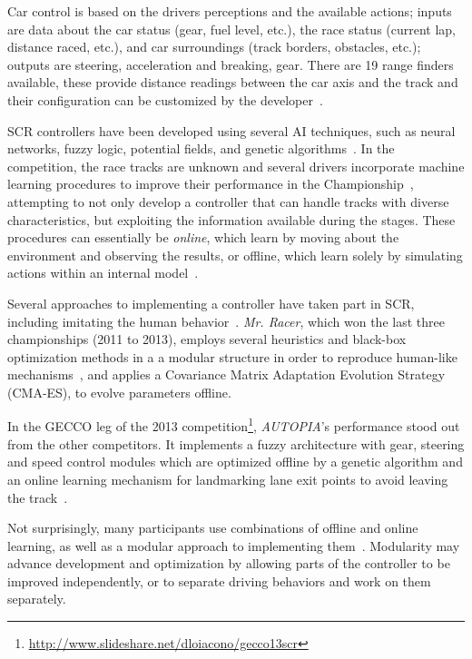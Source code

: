 Car control is based on the drivers perceptions and the available actions; inputs are data about the car status (gear, fuel level, etc.), the race status (current lap, distance raced, etc.), and car surroundings (track borders, obstacles, etc.); outputs are steering, acceleration and breaking, gear. There are 19 range finders available, these provide distance readings between the car axis and the track and their configuration can be customized by the developer~\cite{SCR}.

SCR controllers have been developed using several AI techniques, such as neural networks, fuzzy logic, potential fields, and genetic algorithms~\cite{Loiacono:2012:LEA:2212908.2212953}. In the competition, the race tracks are unknown and several drivers incorporate machine learning procedures to improve their performance in the Championship~\cite{2009}, attempting to not only develop a controller that can handle tracks with diverse characteristics, but exploiting the information available during the stages. These procedures can essentially be \emph{online}, which learn by moving about the environment and observing the results, or offline, which learn solely by simulating actions within an internal model~\cite{mitchell_1997}.

Several approaches to implementing a controller have taken part in SCR, including imitating the human behavior~\cite{Exp,5593318}. \emph{Mr. Racer}, which won the last three championships (2011 to 2013), employs several heuristics and black-box optimization methods in a a modular structure in order to reproduce human-like mechanisms~\cite{MrRacer}, and applies a Covariance Matrix Adaptation Evolution Strategy (CMA-ES), to evolve parameters offline.

In the GECCO leg of the 2013 competition\footnote{\url{http://www.slideshare.net/dloiacono/gecco13scr}}, \emph{AUTOPIA}'s performance stood out from the other competitors. It implements a fuzzy architecture with gear, steering and speed control modules which are optimized offline by a genetic algorithm and an online learning mechanism for landmarking lane exit points to avoid leaving the track~\cite{AUTOPIA}.

Not surprisingly, many participants use combinations of offline and online learning, as well as a modular approach to implementing them~\cite{2009,DIEGO,Exp}. Modularity may advance development and optimization by allowing parts of the controller to be improved independently\cite{MrRacer,AUTOPIA2009}, or to separate driving behaviors and work on them separately.



